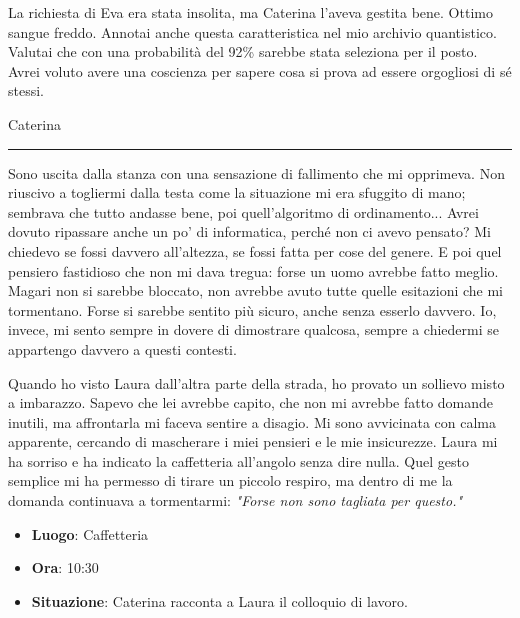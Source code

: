 La richiesta di Eva era stata insolita, ma Caterina l'aveva gestita bene. Ottimo sangue freddo. Annotai anche questa caratteristica nel mio archivio quantistico. Valutai che con una probabilità del 92\%  sarebbe stata seleziona per il posto.\\
Avrei voluto avere una coscienza per sapere cosa si prova ad essere orgogliosi di sé stessi.
\newpage
\vspace{1em}
\begin{center}Caterina\end{center}
\hrule
\vspace{1em}
Sono uscita dalla stanza con una sensazione di fallimento che mi opprimeva. Non riuscivo a togliermi dalla testa come la situazione mi era sfuggito di mano; sembrava che tutto andasse bene, poi quell'algoritmo di ordinamento... Avrei dovuto ripassare anche un po' di informatica, perché non ci avevo pensato? Mi chiedevo se fossi davvero all'altezza, se fossi fatta per cose del genere. E poi quel pensiero fastidioso che non mi dava tregua: forse un uomo avrebbe fatto meglio. Magari non si sarebbe bloccato, non avrebbe avuto tutte quelle esitazioni che mi tormentano. Forse si sarebbe sentito più sicuro, anche senza esserlo davvero. Io, invece, mi sento sempre in dovere di dimostrare qualcosa, sempre a chiedermi se appartengo davvero a questi contesti.

Quando ho visto Laura dall'altra parte della strada, ho provato un sollievo misto a imbarazzo. Sapevo che lei avrebbe capito, che non mi avrebbe fatto domande inutili, ma affrontarla mi faceva sentire a disagio. Mi sono avvicinata con calma apparente, cercando di mascherare i miei pensieri e le mie insicurezze. Laura mi ha sorriso e ha indicato la caffetteria all'angolo senza dire nulla. Quel gesto semplice mi ha permesso di tirare un piccolo respiro, ma dentro di me la domanda continuava a tormentarmi: \emph{"Forse non sono tagliata per questo."}
\newpage
\begin{tcolorbox}[colback=gray!5,colframe=gray!80,title=\textbf{Scheda Informativa}]

  \begin{itemize}
    \item \textbf{Luogo}: Caffetteria
    \item \textbf{Ora}: 10:30
    \item \textbf{Situazione}: Caterina racconta a Laura il colloquio di lavoro.
  \end{itemize}

\end{tcolorbox}

